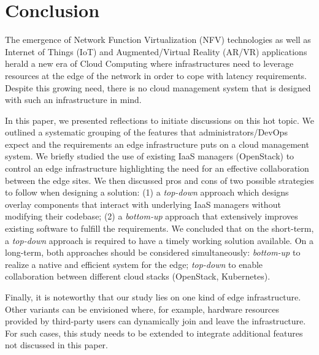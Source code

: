 \section{Conclusion}
\label{sec:conclusion}

The emergence of Network Function Virtualization (NFV) technologies as
well as Internet of Things (IoT) and Augmented/Virtual Reality (AR/VR)
applications herald a new era of Cloud Computing where infrastructures
need to leverage resources at the edge of the network in order to cope
with latency requirements.  Despite this growing need, there is no
cloud management system that is designed with such an infrastructure
in mind.

In this paper, we presented reflections to initiate discussions on this
hot topic. 
We outlined a systematic grouping of the features that administrators/DevOps
expect and the requirements an edge infrastructure puts on a cloud management
system.
We briefly studied the use of existing IaaS managers (\ie OpenStack)
to control an edge infrastructure highlighting the need for an
effective collaboration between the edge sites.  
We then discussed pros and cons of two possible strategies to follow when
designing a solution: (1) a \emph{top-down} approach which designs overlay
components that interact with underlying IaaS managers without modifying their
codebase; (2) a \emph{bottom-up} approach that extensively
improves existing software to fulfill the requirements. We concluded
that on the short-term, a \emph{top-down} approach is required to have
a timely working solution available. On a long-term, both approaches should be
considered simultaneously: \emph{bottom-up} to realize a native and efficient
system for the edge; \emph{top-down} to enable collaboration between different
cloud stacks (\eg OpenStack, Kubernetes).

Finally, it is noteworthy that our study lies on one kind of edge
infrastructure. Other variants can be envisioned where, for example,
hardware resources provided by third-party users can dynamically join
and leave the infrastructure. For such cases, this study needs to be
extended to integrate additional features not discussed in this paper.

